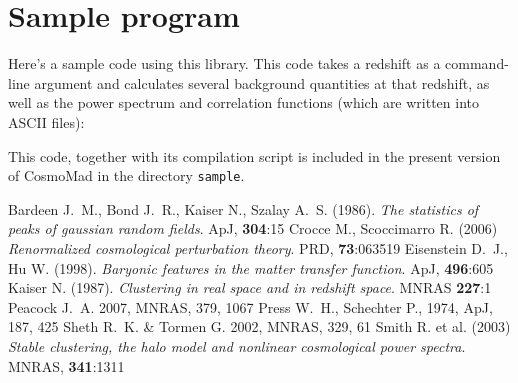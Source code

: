 \documentclass[a4paper,10pt]{article}
\begin{document}
\newpage
\section{Sample program}\label{sec:sample}

Here's a sample code using this library. This code takes a redshift as a command-line argument and calculates
several background quantities at that redshift, as well as the power spectrum and correlation functions (which
are written into ASCII files):



This code, together with its compilation script is included in the present version of CosmoMad
in the directory {\tt sample}.

\begin{thebibliography}{}
  Bardeen J.~M., Bond J.~R., Kaiser N., Szalay A.~S. (1986). {\sl The statistics of peaks of gaussian random fields}. ApJ, {\bf 304}:15
  Crocce M., Scoccimarro R. (2006) {\sl Renormalized cosmological perturbation theory}. PRD, {\bf 73}:063519
  Eisenstein D.~J., Hu W. (1998). {\sl Baryonic features in the matter transfer function}. ApJ, {\bf 496}:605
  Kaiser N. (1987). {\sl  Clustering in real space and in redshift space}. MNRAS {\bf 227}:1
  Peacock J.~A. 2007, MNRAS, 379, 1067
  Press W.~H., Schechter P., 1974, ApJ, 187, 425
  Sheth R.~K. \& Tormen G. 2002, MNRAS, 329, 61
  Smith R. et al. (2003) {\sl Stable clustering, the halo model and nonlinear cosmological power spectra}. MNRAS, {\bf 341}:1311
\end{thebibliography}
\end{document}
